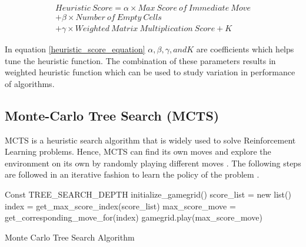 \documentclass{svproc}
\begin{document}
    \begin{multline} \label{heuristic_score_equation}
    Heuristic \ Score  = \alpha \times Max \ Score \ of \  Immediate \ Move \\
    + \beta \times Number \ of \ Empty \  Cells \\
    + \gamma \times Weighted \ Matrix \ Multiplication \ Score  + K
    \end{multline}

    In equation \ref{heuristic_score_equation} \(\alpha ,  \beta , \gamma , and K \) are coefficients which helps tune the heuristic function. The combination of these parameters results in weighted heuristic function which can be used to study variation in performance of algorithms.

    \subsection{Monte-Carlo Tree Search (MCTS)}

    MCTS is a heuristic search algorithm that is widely used to solve Reinforcement Learning problems. Hence, MCTS can find its own moves and explore the environment on its own by randomly playing different moves \cite{mcts_comparison}. The following steps are followed in an iterative fashion to learn the policy of the problem \cite{mcts_medium}.

    \begin{algorithm}[h!]
        \SetAlgoLined
        Const TREE\_SEARCH\_DEPTH\;
        initialize\_gamegrid()\;
         {
            score\_list = new list()\;
            index =  get\_max\_score\_index(score\_list)\;
            max\_score\_move = get\_corresponding\_move\_for(index)\;
            gamegrid.play(max\_score\_move)\;
        }
        \caption{Monte Carlo Tree Search Algorithm}
    \end{algorithm}
\end{document}
